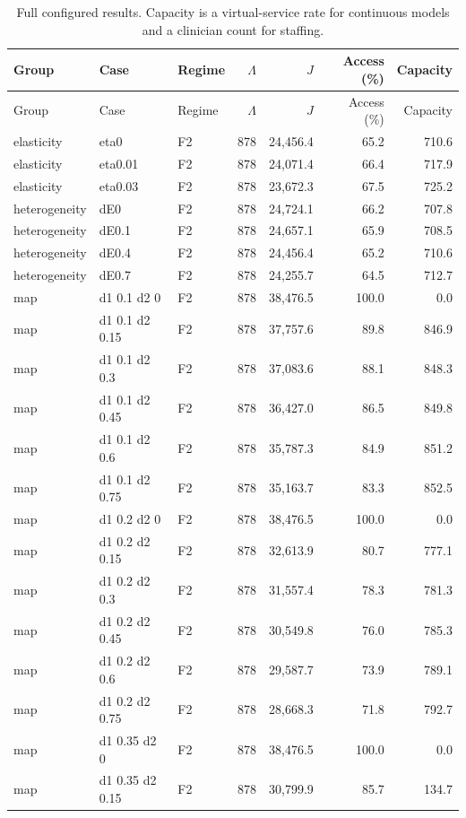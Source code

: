 \begin{longtable}{p{1.8cm}p{3.35cm}lrrrr}
\caption{Full configured results. Capacity is a virtual-service rate for continuous models and a clinician count for staffing.}\label{tab:all}\\
\toprule Group & Case & Regime & $\Lambda$ & $J$ & Access (\%) & Capacity\\\midrule\endfirsthead
\toprule Group & Case & Regime & $\Lambda$ & $J$ & Access (\%) & Capacity\\\midrule\endhead
elasticity & eta0 & F2 & 878 & 24,456.4 & 65.2 & 710.6\\
elasticity & eta0.01 & F2 & 878 & 24,071.4 & 66.4 & 717.9\\
elasticity & eta0.03 & F2 & 878 & 23,672.3 & 67.5 & 725.2\\
heterogeneity & dE0 & F2 & 878 & 24,724.1 & 66.2 & 707.8\\
heterogeneity & dE0.1 & F2 & 878 & 24,657.1 & 65.9 & 708.5\\
heterogeneity & dE0.4 & F2 & 878 & 24,456.4 & 65.2 & 710.6\\
heterogeneity & dE0.7 & F2 & 878 & 24,255.7 & 64.5 & 712.7\\
map & d1 0.1 d2 0 & F2 & 878 & 38,476.5 & 100.0 & 0.0\\
map & d1 0.1 d2 0.15 & F2 & 878 & 37,757.6 & 89.8 & 846.9\\
map & d1 0.1 d2 0.3 & F2 & 878 & 37,083.6 & 88.1 & 848.3\\
map & d1 0.1 d2 0.45 & F2 & 878 & 36,427.0 & 86.5 & 849.8\\
map & d1 0.1 d2 0.6 & F2 & 878 & 35,787.3 & 84.9 & 851.2\\
map & d1 0.1 d2 0.75 & F2 & 878 & 35,163.7 & 83.3 & 852.5\\
map & d1 0.2 d2 0 & F2 & 878 & 38,476.5 & 100.0 & 0.0\\
map & d1 0.2 d2 0.15 & F2 & 878 & 32,613.9 & 80.7 & 777.1\\
map & d1 0.2 d2 0.3 & F2 & 878 & 31,557.4 & 78.3 & 781.3\\
map & d1 0.2 d2 0.45 & F2 & 878 & 30,549.8 & 76.0 & 785.3\\
map & d1 0.2 d2 0.6 & F2 & 878 & 29,587.7 & 73.9 & 789.1\\
map & d1 0.2 d2 0.75 & F2 & 878 & 28,668.3 & 71.8 & 792.7\\
map & d1 0.35 d2 0 & F2 & 878 & 38,476.5 & 100.0 & 0.0\\
map & d1 0.35 d2 0.15 & F2 & 878 & 30,799.9 & 85.7 & 134.7\\

\end{longtable}
